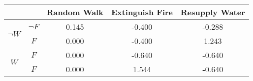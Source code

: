 \begin{center}
\begin{tabular}{|c|c|c|c|c|}
  \hline
  &   & Random Walk & Extinguish Fire & Resupply Water\\
  \hline
  \multirow{2}{*}{$\neg W$} & $\neg F$ & 0.145 & -0.400 & -0.288\\
  \cline{2-5}
   & $F$ & 0.000 & -0.400 & 1.243\\
  \hline
  \multirow{2}{*}{$W$} & $F$ & 0.000 & -0.640 & -0.640\\
  \cline{2-5}
   & $F$ & 0.000 & 1.544 & -0.640\\
  \hline
\end{tabular}
\end{center}
